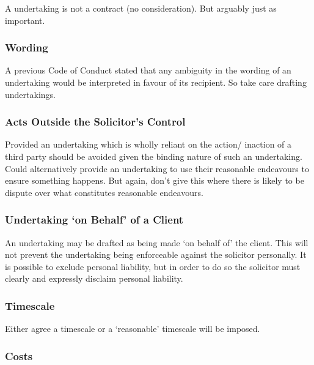 \documentclass[
]{article}
\begin{document}
A undertaking is not a contract (no consideration). But arguably just as
important.

\hypertarget{wording}{%
\subsubsection{Wording}\label{wording}}

A previous Code of Conduct stated that any ambiguity in the wording of
an undertaking would be interpreted in favour of its recipient. So take
care drafting undertakings.

\hypertarget{acts-outside-the-solicitors-control}{%
\subsubsection{Acts Outside the Solicitor's
Control}\label{acts-outside-the-solicitors-control}}

Provided an undertaking which is wholly reliant on the action/ inaction
of a third party should be avoided given the binding nature of such an
undertaking. Could alternatively provide an undertaking to use their
reasonable endeavours to ensure something happens. But again, don't give
this where there is likely to be dispute over what constitutes
reasonable endeavours.

\hypertarget{undertaking-on-behalf-of-a-client}{%
\subsubsection{Undertaking `on Behalf' of a
Client}\label{undertaking-on-behalf-of-a-client}}

An undertaking may be drafted as being made `on behalf of' the client.
This will not prevent the undertaking being enforceable against the
solicitor personally. It is possible to exclude personal liability, but
in order to do so the solicitor must clearly and expressly disclaim
personal liability.

\hypertarget{timescale}{%
\subsubsection{Timescale}\label{timescale}}

Either agree a timescale or a `reasonable' timescale will be imposed.

\hypertarget{costs}{%
\subsubsection{Costs}\label{costs}}
\end{document}
